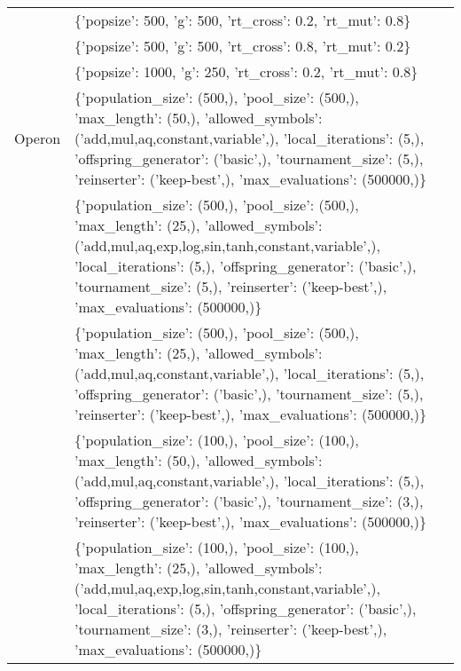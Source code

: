 \begin{tabular}{l p{37em}}
              &                                                                                                                                                                                                                                     \{'popsize': 500, 'g': 500, 'rt\_cross': 0.2, 'rt\_mut': 0.8\} \\
              &                                                                                                                                                                                                                                     \{'popsize': 500, 'g': 500, 'rt\_cross': 0.8, 'rt\_mut': 0.2\} \\
              &                                                                                                                                                                                                                                    \{'popsize': 1000, 'g': 250, 'rt\_cross': 0.2, 'rt\_mut': 0.8\} \\
\midrule
       Operon &                  \{'population\_size': (500,), 'pool\_size': (500,), 'max\_length': (50,), 'allowed\_symbols': ('add,mul,aq,constant,variable',), 'local\_iterations': (5,), 'offspring\_generator': ('basic',), 'tournament\_size': (5,), 'reinserter': ('keep-best',), 'max\_evaluations': (500000,)\} \\
              & \{'population\_size': (500,), 'pool\_size': (500,), 'max\_length': (25,), 'allowed\_symbols': ('add,mul,aq,exp,log,sin,tanh,constant,variable',), 'local\_iterations': (5,), 'offspring\_generator': ('basic',), 'tournament\_size': (5,), 'reinserter': ('keep-best',), 'max\_evaluations': (500000,)\} \\
              &                  \{'population\_size': (500,), 'pool\_size': (500,), 'max\_length': (25,), 'allowed\_symbols': ('add,mul,aq,constant,variable',), 'local\_iterations': (5,), 'offspring\_generator': ('basic',), 'tournament\_size': (5,), 'reinserter': ('keep-best',), 'max\_evaluations': (500000,)\} \\
              &                  \{'population\_size': (100,), 'pool\_size': (100,), 'max\_length': (50,), 'allowed\_symbols': ('add,mul,aq,constant,variable',), 'local\_iterations': (5,), 'offspring\_generator': ('basic',), 'tournament\_size': (3,), 'reinserter': ('keep-best',), 'max\_evaluations': (500000,)\} \\
              & \{'population\_size': (100,), 'pool\_size': (100,), 'max\_length': (25,), 'allowed\_symbols': ('add,mul,aq,exp,log,sin,tanh,constant,variable',), 'local\_iterations': (5,), 'offspring\_generator': ('basic',), 'tournament\_size': (3,), 'reinserter': ('keep-best',), 'max\_evaluations': (500000,)\} \\

\end{tabular}
